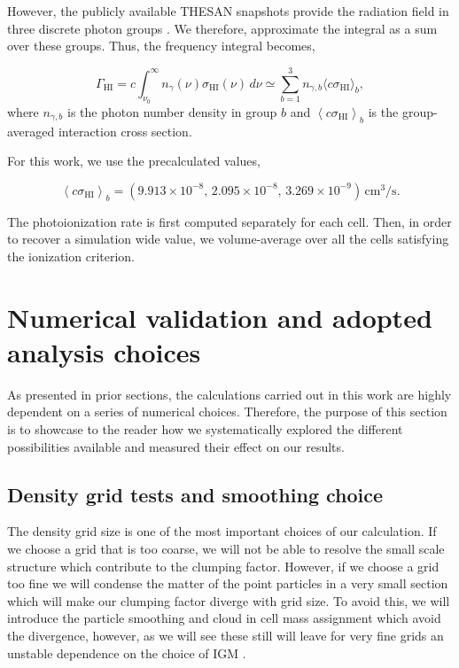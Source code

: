 \documentclass[%
 reprint,
nofootinbib,
 amsmath,amssymb,
 aps,
]{revtex4-2}
\begin{document}
However, the publicly available THESAN snapshots provide the radiation field in three discrete photon groups \cite{garaldi2022thesan}. We therefore, approximate the integral as a sum over these groups. Thus, the frequency integral becomes,

\begin{equation}
\Gamma_{\mathrm{HI}} = c\int_{\nu_0}^{\infty}n_\gamma(\nu)\sigma_{\mathrm{HI}}(\nu)\,d\nu
\simeq \sum_{b=1}^{3}n_{\gamma,b}\langle c\sigma_{\mathrm{HI}}\rangle_b,
\end{equation}
where $n_{\gamma,b}$ is the photon number density in group $b$ and $\left\langle c\sigma_{\mathrm{HI}}\right\rangle_b$ is the group-averaged interaction cross section.


For this work, we use the precalculated values,

\begin{equation}
\left\langle c\sigma_{\mathrm{HI}}\right\rangle_b =
\left(
9.913\times10^{-8},\,
2.095\times10^{-8},\,
3.269\times10^{-9}
\right)\,\mathrm{cm^3/s}.
\end{equation}

The photoionization rate is first computed separately for each cell. Then, in order to recover a simulation wide value, we volume-average over all the cells satisfying the ionization criterion.

\section{Numerical validation and adopted analysis choices}

As presented in prior sections, the calculations carried out in this work are highly dependent on a series of numerical choices. Therefore, the purpose of this section is to showcase to the reader how we systematically explored the different possibilities available and measured their effect on our results. 

\subsection{Density grid tests and smoothing choice}
\label{sec:density-grid-tests}
The density grid size is one of the most important choices of our calculation. If we choose a grid that is too coarse, we will not be able to resolve the small scale structure which contribute to the clumping factor. However, if we choose a grid too fine we will condense the matter of the point particles in a very small section which will make our clumping factor diverge with grid size. To avoid this, we will introduce the particle smoothing and cloud in cell mass assignment which avoid the divergence, however, as we will see these still will leave for very fine grids an unstable dependence on the choice of IGM \cite{jing2005correcting}. 
\end{document}
